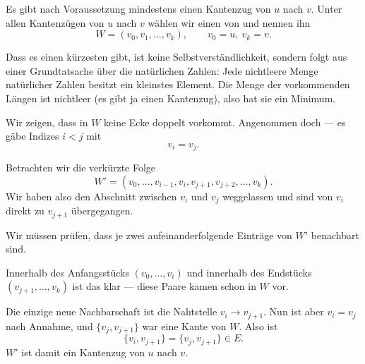 \begin{merksatz}
Es gibt nach Voraussetzung mindestens einen Kantenzug von $u$ nach $v$. Unter allen Kantenzügen von $u$ nach $v$ wählen wir einen von  und nennen ihn
\[ W = (v_0, v_1, \ldots, v_k), \qquad v_0 = u,\ v_k = v . \]

Dass es einen kürzesten gibt, ist keine Selbstverständlichkeit, sondern folgt aus einer Grundtatsache über die natürlichen Zahlen: Jede nichtleere Menge natürlicher Zahlen besitzt ein kleinstes Element. Die Menge der vorkommenden Längen ist nichtleer (es gibt ja einen Kantenzug), also hat sie ein Minimum.

Wir zeigen, dass in $W$ keine Ecke doppelt vorkommt. Angenommen doch --- es gäbe Indizes $i < j$ mit
\[ v_i = v_j . \]

Betrachten wir die verkürzte Folge
\[ W' = (v_0, \ldots, v_{i-1}, v_i, v_{j+1}, v_{j+2}, \ldots, v_k) . \]
Wir haben also den Abschnitt zwischen $v_i$ und $v_j$ weggelassen und sind von $v_i$ direkt zu $v_{j+1}$ übergegangen.

\begin{center}
\end{center}

Wir müssen prüfen, dass je zwei aufeinanderfolgende Einträge von $W'$ benachbart sind.

Innerhalb des Anfangsstücks $(v_0, \ldots, v_i)$ und innerhalb des Endstücks $(v_{j+1}, \ldots, v_k)$ ist das klar --- diese Paare kamen schon in $W$ vor.

Die einzige neue Nachbarschaft ist die Nahtstelle $v_i \to v_{j+1}$. Nun ist aber $v_i = v_j$ nach Annahme, und $\{v_j, v_{j+1}\}$ war eine Kante von $W$. Also ist
\[ \{v_i, v_{j+1}\} = \{v_j, v_{j+1}\} \in E . \]
$W'$ ist damit ein Kantenzug von $u$ nach $v$.


\end{merksatz}

